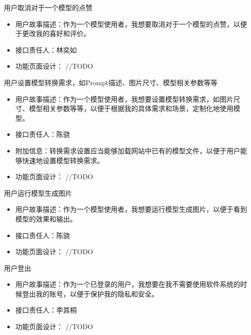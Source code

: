 \begin{frame}{用户取消对于一个模型的点赞}
    \begin{itemize}
        \item 用户故事描述：作为一个模型使用者，我想要取消对于一个模型的点赞，以便于更改我的喜好和评价。
        \item 接口责任人：林奕如
        \item 功能页面设计： //TODO
    \end{itemize}
\end{frame}

\begin{frame}{用户设置模型转换需求，如Prompt描述、图片尺寸、模型相关参数等等}
    \begin{itemize}
        \item 用户故事描述：作为一个模型使用者，我想要设置模型转换需求，如图片尺寸、模型相关参数等等，以便于根据我的具体需求和场景，定制化地使用模型。
        \item 接口责任人：陈骁
        \item 附加信息：转换需求设置应当能够加载网站中已有的模型文件，以便于用户能够快速地设置模型转换需求。
        \item 功能页面设计： //TODO
    \end{itemize}
\end{frame}

\begin{frame}{用户运行模型生成图片}
    \begin{itemize}
        \item 用户故事描述：作为一个模型使用者，我想要运行模型生成图片，以便于看到模型的效果和输出。
        \item 接口责任人：陈骁
        \item 功能页面设计： //TODO
    \end{itemize}
\end{frame}

\begin{frame}{用户登出}
    \begin{itemize}
        \item 用户故事描述：作为一个已登录的用户，我想要在我不需要使用软件系统的时候登出我的账号，以便于保护我的隐私和安全。
        \item 接口责任人：李其桐
        \item 功能页面设计： //TODO
    \end{itemize}
\end{frame}
